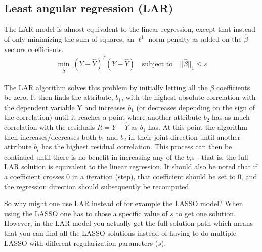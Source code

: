 \subsection{Least angular regression (LAR)}
The LAR model is almost equivalent to the linear regression, except that instead of only minimizing the sum of squares, an $\ell^1$ norm penalty as added on the $\hat{\beta}$-vectors coefficients.
\begin{align}
\min_{\hat{\beta}}\ (Y - \hat{Y})^T (Y - \hat{Y}) \quad \text{subject to} \quad ||\hat{\beta}||_1 \le s
\end{align}

The LAR algorithm \cite{LAR-algorithm} solves this problem by initially letting all the $\beta$ coefficients be zero.
It then finds the attribute, $b_1$, with the highest absolute correlation with the dependent variable Y and increases $b_1$  (or decreases depending on the sign of the correlation)
until it reaches a point where another attribute $b_2$ has as much  correlation with the residuals $R=Y-\hat{Y}$ as  $b_1$ has.
At this point the algorithm then increases/decreases both $b_1$ and $b_2$ in their joint direction until another attribute $b_i$ has the highest residual correlation.
This process can then be continued until there is no benefit in increasing any of the $b_i$s - that is, the full LAR solution is equivalent to the linear regression.
It should also be noted that if a coefficient crosses 0 in a iteration (step),
that coefficient should be set to 0, and the regression direction should subsequently be recomputed.

So why might one use LAR instead of for example the LASSO model? 
When using the LASSO one has to chose a specific value of $s$ to get one solution.
However, in the LAR model you actually get the full solution path which means that you can find all the LASSO solutions instead of having to do multiple LASSO with different regularization parameters ($s$).
